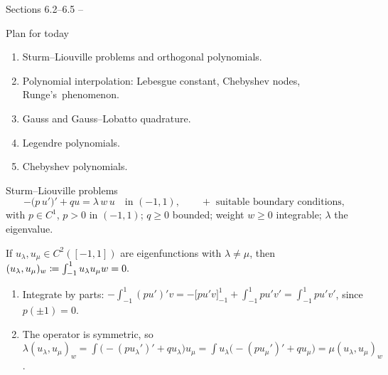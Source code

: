 
{Sections 6.2--6.5}
{}
{--}

\begin{frame}{Plan for today}
    \begin{enumerate}
        \item Sturm--Liouville problems and orthogonal polynomials.
        \item Polynomial interpolation: Lebesgue constant, Chebyshev nodes, \mbox{Runge's phenomenon.}
        \item Gauss and Gauss--Lobatto quadrature.
        \item Legendre polynomials.
        \item Chebyshev polynomials.
    \end{enumerate}
    \bigskip
\end{frame}

\begin{frame}{Sturm--Liouville problems}
    \small
    \[
        \tag{SL}
        -\big(p\, u'\big)' + q u = \lambda\, w\, u \quad \text{in } (-1,1), \qquad + \text{ suitable boundary conditions},
    \]
    with $p \in C^1$, $p > 0$ in $(-1,1)$; $q \ge 0$ bounded; weight $w \ge 0$ integrable; $\lambda$ the eigenvalue.
    \begin{lemma}[Singular case $p(\pm1) = 0$]
        If $u_\lambda, u_\mu \in C^2([-1,1])$ are eigenfunctions with $\lambda \ne \mu$, then
        \(
        (u_\lambda, u_\mu)_w \coloneqq \int_{-1}^1 u_\lambda u_\mu w = 0.
        \)
    \end{lemma}
    \begin{proofsteps}
        \begin{enumerate}
            \item Integrate by parts: $-\int_{-1}^1 (pu')'v = -\big[p u' v\big]_{-1}^{1} + \int_{-1}^1 p u' v' = \int_{-1}^1 p u'v'$, since $p(\pm 1) = 0$.
            \item The operator is symmetric, so
                  $\lambda (u_\lambda, u_\mu)_w = \int \big(-(pu_\lambda')' + qu_\lambda\big) u_\mu = \int u_\lambda \big(-(pu_\mu')' + qu_\mu\big) = \mu (u_\lambda, u_\mu)_w$.
        \end{enumerate}
    \end{proofsteps}
\end{frame}

